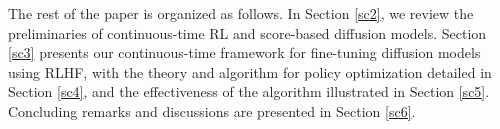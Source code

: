 The rest of the paper is organized as follows. In Section \ref{sc2}, we review the preliminaries of continuous-time RL and score-based diffusion models. Section \ref{sc3} presents our continuous-time  framework for fine-tuning diffusion models using RLHF, with the theory and algorithm for policy optimization detailed in Section \ref{sc4}, and the effectiveness of the algorithm illustrated in Section \ref{sc5}. Concluding remarks and discussions are presented in Section \ref{sc6}.